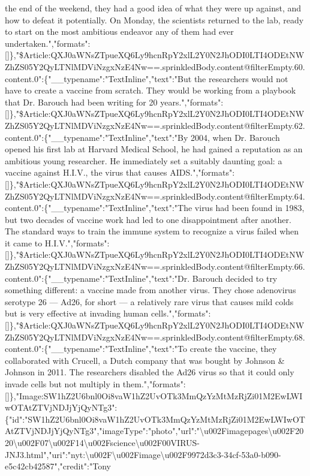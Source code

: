 the end of the weekend, they had a good idea of what they were up
against, and how to defeat it potentially. On Monday, the scientists
returned to the lab, ready to start on the most ambitious endeavor any
of them had ever
undertaken.","formats":{[}{]}\},"\$Article:QXJ0aWNsZTpueXQ6Ly9hcnRpY2xlL2Y0N2JhODI0LTI4ODEtNWZhZS05Y2QyLTNlMDViNzgxNzE4Nw==.sprinkledBody.content@filterEmpty.60.content.0":\{"\_\_typename":"TextInline","text":"But
the researchers would not have to create a vaccine from scratch. They
would be working from a playbook that Dr. Barouch had been writing for
20
years.","formats":{[}{]}\},"\$Article:QXJ0aWNsZTpueXQ6Ly9hcnRpY2xlL2Y0N2JhODI0LTI4ODEtNWZhZS05Y2QyLTNlMDViNzgxNzE4Nw==.sprinkledBody.content@filterEmpty.62.content.0":\{"\_\_typename":"TextInline","text":"By
2004, when Dr. Barouch opened his first lab at Harvard Medical School,
he had gained a reputation as an ambitious young researcher. He
immediately set a suitably daunting goal: a vaccine against H.I.V., the
virus that causes
AIDS.","formats":{[}{]}\},"\$Article:QXJ0aWNsZTpueXQ6Ly9hcnRpY2xlL2Y0N2JhODI0LTI4ODEtNWZhZS05Y2QyLTNlMDViNzgxNzE4Nw==.sprinkledBody.content@filterEmpty.64.content.0":\{"\_\_typename":"TextInline","text":"The
virus had been found in 1983, but two decades of vaccine work had led to
one disappointment after another. The standard ways to train the immune
system to recognize a virus failed when it came to
H.I.V.","formats":{[}{]}\},"\$Article:QXJ0aWNsZTpueXQ6Ly9hcnRpY2xlL2Y0N2JhODI0LTI4ODEtNWZhZS05Y2QyLTNlMDViNzgxNzE4Nw==.sprinkledBody.content@filterEmpty.66.content.0":\{"\_\_typename":"TextInline","text":"Dr.
Barouch decided to try something different: a vaccine made from another
virus. They chose adenovirus serotype 26 --- Ad26, for short --- a
relatively rare virus that causes mild colds but is very effective at
invading human
cells.","formats":{[}{]}\},"\$Article:QXJ0aWNsZTpueXQ6Ly9hcnRpY2xlL2Y0N2JhODI0LTI4ODEtNWZhZS05Y2QyLTNlMDViNzgxNzE4Nw==.sprinkledBody.content@filterEmpty.68.content.0":\{"\_\_typename":"TextInline","text":"To
create the vaccine, they collaborated with Crucell, a Dutch company that
was bought by Johnson \& Johnson in 2011. The researchers disabled the
Ad26 virus so that it could only invade cells but not multiply in
them.","formats":{[}{]}\},"Image:SW1hZ2U6bnl0Oi8vaW1hZ2UvOTk3MmQzYzMtMzRjZi01M2EwLWIwOTAtZTVjNDJjYjQyNTg3":\{"id":"SW1hZ2U6bnl0Oi8vaW1hZ2UvOTk3MmQzYzMtMzRjZi01M2EwLWIwOTAtZTVjNDJjYjQyNTg3","imageType":"photo","url":"\textbackslash{}u002Fimagepages\textbackslash{}u002F2020\textbackslash{}u002F07\textbackslash{}u002F14\textbackslash{}u002Fscience\textbackslash{}u002F00VIRUS-JNJ3.html","uri":"nyt:\textbackslash{}u002F\textbackslash{}u002Fimage\textbackslash{}u002F9972d3c3-34cf-53a0-b090-e5c42cb42587","credit":"Tony
